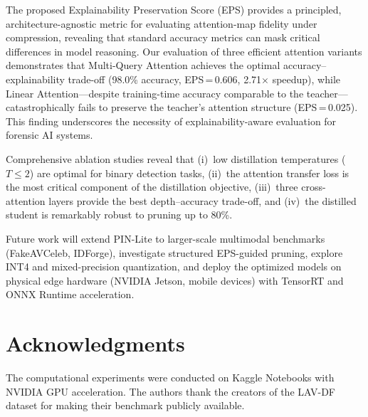 \documentclass[lettersize,journal]{IEEEtran}
\begin{document}
The proposed Explainability Preservation Score (EPS) provides a principled, architecture-agnostic metric for evaluating attention-map fidelity under compression, revealing that standard accuracy metrics can mask critical differences in model reasoning. Our evaluation of three efficient attention variants demonstrates that Multi-Query Attention achieves the optimal accuracy--explainability trade-off (98.0\% accuracy, EPS\,=\,0.606, 2.71$\times$ speedup), while Linear Attention---despite training-time accuracy comparable to the teacher---catastrophically fails to preserve the teacher's attention structure (EPS\,=\,0.025). This finding underscores the necessity of explainability-aware evaluation for forensic AI systems.

Comprehensive ablation studies reveal that (i)~low distillation temperatures ($T \leq 2$) are optimal for binary detection tasks, (ii)~the attention transfer loss is the most critical component of the distillation objective, (iii)~three cross-attention layers provide the best depth--accuracy trade-off, and (iv)~the distilled student is remarkably robust to pruning up to 80\%.

Future work will extend PIN-Lite to larger-scale multimodal benchmarks (FakeAVCeleb, IDForge), investigate structured EPS-guided pruning, explore INT4 and mixed-precision quantization, and deploy the optimized models on physical edge hardware (NVIDIA Jetson, mobile devices) with TensorRT and ONNX Runtime acceleration.


\section*{Acknowledgments}
The computational experiments were conducted on Kaggle Notebooks with NVIDIA GPU acceleration. The authors thank the creators of the LAV-DF dataset for making their benchmark publicly available.
\end{document}
